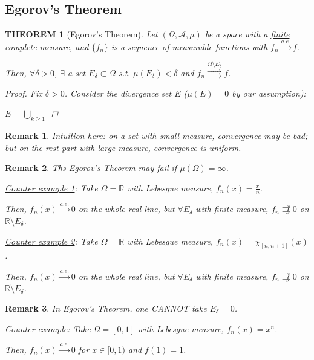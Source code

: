 \documentclass[12pt]{article}
\theoremstyle{blueplain}
\newtheorem{theorem}{THEOREM}[section]
\theoremstyle{bluedef}
\theoremstyle{blueremark}
\newtheorem{remark}{Remark}[section]
\newcommand{\R}{\mathbb{R}}
\numberwithin{equation}{section}
\begin{document}
\clearpage

\subsection{Egorov's Theorem}

\begin{theorem}[Egorov's Theorem]

  Let $(\Omega, \mathcal{A}, \mu)$ be a space with a \underline{finite} complete measure, and $\{f_n\}$ is a sequence of measurable functions with $f_n \overset{a.e.}{\rightarrow} f$.

  Then, $\forall \delta > 0$, $\exists$ a set $E_\delta \subset \Omega$ s.t. $\mu(E_\delta) < \delta$ and $f_n \overset{\Omega \setminus E_\delta}{\rightrightarrows} f$.

  \begin{proof}
    Fix $\delta > 0$. Consider the divergence set $E$ ($\mu(E) = 0$ by our assumption):

    $E = \bigcup_{k \geq 1} $
  \end{proof}
\end{theorem}

\begin{remark}
  Intuition here: on a set with small measure, convergence may be bad; but on the rest part with large measure, convergence is uniform.
\end{remark}

\begin{remark}
  Ths Egorov's Theorem may fail if $\mu(\Omega) = \infty$.

  \underline{Counter example 1}: Take $\Omega = \R$ with Lebesgue measure, $f_n(x) = \frac{x}{n}$.

  Then, $f_n(x) \overset{a.e.}{\rightarrow} 0$ on the whole real line, but $\forall E_\delta$ with finite measure, $f_n \not \rightrightarrows 0$ on $\R \setminus E_\delta$.

  \underline{Counter example 2}: Take $\Omega = \R$ with Lebesgue measure, $f_n(x) = \chi_{[n, n+1]}(x)$.

  Then, $f_n(x) \overset{a.e.}{\rightarrow} 0$ on the whole real line, but $\forall E_\delta$ with finite measure, $f_n \not \rightrightarrows 0$ on $\R \setminus E_\delta$.
\end{remark}

\begin{remark}
  In Egorov's Theorem, one CANNOT take $E_\delta = 0$.

  \underline{Counter example}: Take $\Omega = [0,1]$ with Lebesgue measure, $f_n(x) = x^n$.

  Then, $f_n(x) \overset{a.e.}{\rightarrow} 0$ for $x \in [0,1)$ and $f(1) = 1$.
\end{remark}
\end{document}
